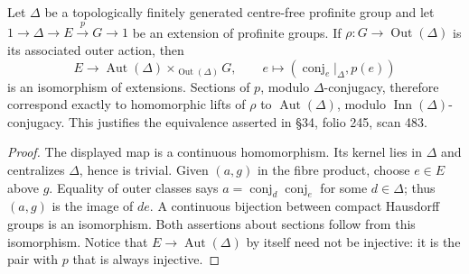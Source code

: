 Let $\Delta$ be a topologically finitely generated centre-free profinite group
and let $1\to\Delta\to E\xrightarrow{p}G\to1$ be an extension of profinite groups.
If $\rho:G\to\operatorname{Out}(\Delta)$ is its associated outer action, then
\[
 E\longrightarrow
 \operatorname{Aut}(\Delta)\mathbin{\times}_{\operatorname{Out}(\Delta)}G,
 \qquad e\longmapsto(\operatorname{conj}_e|_\Delta,p(e))
\]
is an isomorphism of extensions.  Sections of $p$, modulo $\Delta$-conjugacy,
therefore correspond exactly to homomorphic lifts of $\rho$ to
$\operatorname{Aut}(\Delta)$, modulo $\operatorname{Inn}(\Delta)$-conjugacy.
This justifies the equivalence asserted in \S34, folio 245, scan 483.
\begin{proof}
The displayed map is a continuous homomorphism.  Its kernel lies in $\Delta$
and centralizes $\Delta$, hence is trivial.  Given $(a,g)$ in the fibre product,
choose $e\in E$ above $g$.  Equality of outer classes says
$a=\operatorname{conj}_d\operatorname{conj}_e$ for some $d\in\Delta$; thus
$(a,g)$ is the image of $de$.  A continuous bijection between compact Hausdorff
groups is an isomorphism.  Both assertions about sections follow from this
isomorphism.  Notice that $E\to\operatorname{Aut}(\Delta)$ by itself need not be
injective: it is the pair with $p$ that is always injective.
\end{proof}

